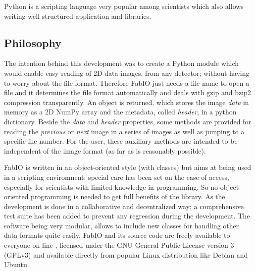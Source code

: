\documentclass[preprint ]{iucr}
\begin{document}
Python \cite{python} is a scripting language very popular among scientists
which also allows writing well structured application and libraries.

\subsection{Philosophy}

The intention behind this development was to create a Python module which would
enable easy reading of 2D data images, from any detector; without having to
worry about the file format.
Therefore FabIO just needs a file name to open a file and it determines the
file format automatically and deals with gzip \cite{gzip} and bzip2
\cite{bzip2} compression transparently.
An object is returned, which stores the image
{\em data} in memory as a 2D NumPy array \cite{numpy} and the metadata,
called {\em header}, in a python dictionary. Beside the
{\em data} and {\em header} properties, some methods are provided for reading
the {\em previous} or {\em next} image in a series of images as well as jumping
to a specific file number.
For the user, these auxiliary methods are intended to be independent of
the image format (as far as is reasonably possible).

FabIO is written in an object-oriented style (with classes) but aims at being
used in a scripting environment: special care has been set on the ease of
access, especially for scientists with limited knowledge in programming. So
no object-oriented programming is needed to get full benefits of
the library. 
As the development is done in a collaborative and decentralized way; a
comprehensive test suite has been added to prevent any regression during the
development. The software being very modular, allows to include new
classes for handling other data formats quite easily.
FabIO and its source-code are freely available to everyone on-line \cite{fabio}, 
licensed under the GNU General Public License version 3 (GPLv3) and available
directly from popular Linux distribution like Debian and Ubuntu.
\end{document}
